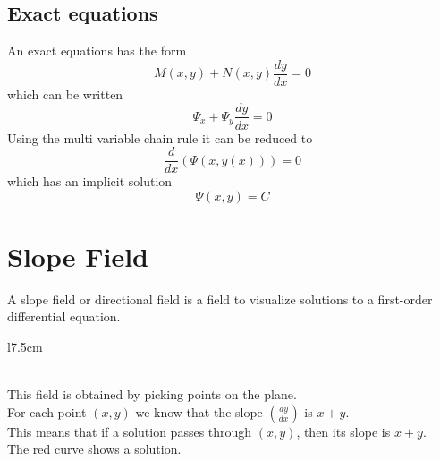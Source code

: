 \documentclass{article}
\begin{document}
\pagebreak

\subsection{Exact equations}

An exact equations has the form
\[
    M(x,y)+N(x,y)\frac{dy}{dx}=0
\]
which can be written
\[
    \Psi_x+\Psi_y \frac{dy}{dx}=0
\]
Using the multi variable chain rule it can be reduced to
\[
    \frac{d}{dx}\left( \Psi(x,y(x)) \right) = 0
\]
which has an implicit solution
\[
    \Psi(x,y)=C
\]


\pagebreak

\section{Slope Field}

A slope field or directional field is a field to visualize
solutions to a first-order differential equation.

\begin{wrapfigure}{l}{7.5cm}
\end{wrapfigure}

\phantom{ } \\

This field is obtained by picking points on the plane. \\
For each point \((x,y)\) we know that the slope \((\frac{dy}{dx})\)
is \(x + y\). \\
This means that if a solution passes through \((x,y)\), then its slope is \(x+y\). \\
The red curve shows a solution.
\end{document}

